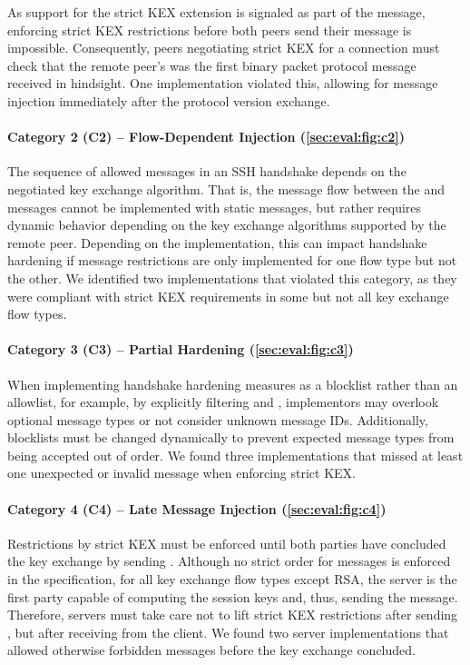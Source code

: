 As support for the strict KEX extension is signaled as part of the \msgkexinit message, enforcing strict KEX restrictions before both peers send their \msgkexinit message is impossible. Consequently, peers negotiating strict KEX for a connection must check that the remote peer's \msgkexinit was the first binary packet protocol message received in hindsight. One implementation violated this, allowing for message injection immediately after the protocol version exchange.

\paragraph{Category 2 (C2) -- Flow-Dependent Injection (\autoref{sec:eval:fig:c2})}

The sequence of allowed messages in an SSH handshake depends on the negotiated key exchange algorithm. That is, the message flow between the \msgkexinit and \msgnewkeys messages cannot be implemented with static messages, but rather requires dynamic behavior depending on the key exchange algorithms supported by the remote peer. Depending on the implementation, this can impact handshake hardening if message restrictions are only implemented for one flow type but not the other. We identified two implementations that violated this category, as they were compliant with strict KEX requirements in some but not all key exchange flow types.

\paragraph{Category 3 (C3) -- Partial Hardening (\autoref{sec:eval:fig:c3})}

When implementing handshake hardening measures as a blocklist rather than an allowlist, for example, by explicitly filtering \msgignore and \msgdebug, implementors may overlook optional message types or not consider unknown message IDs. Additionally, blocklists must be changed dynamically to prevent expected message types from being accepted out of order. We found three implementations that missed at least one unexpected or invalid message when enforcing strict KEX.

\paragraph{Category 4 (C4) -- Late Message Injection (\autoref{sec:eval:fig:c4})}

Restrictions by strict KEX must be enforced until both parties have concluded the key exchange by sending \msgnewkeys. Although no strict order for \msgnewkeys messages is enforced in the specification, for all key exchange flow types except RSA, the server is the first party capable of computing the session keys and, thus, sending the \msgnewkeys message. Therefore, servers must take care not to lift strict KEX restrictions after sending \msgnewkeys, but after receiving \msgnewkeys from the client. We found two server implementations that allowed otherwise forbidden messages before the key exchange concluded.

